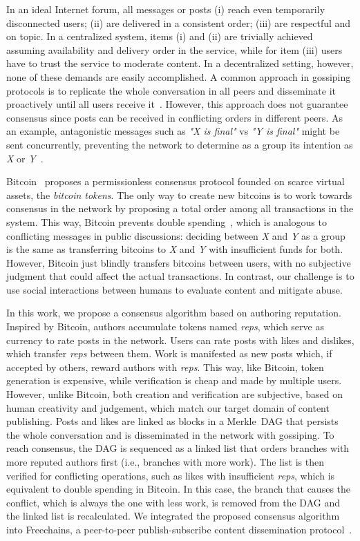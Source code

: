 \documentclass[10pt,journal,compsoc]{IEEEtran}
\newcommand{\reps}     {\emph{reps}\xspace}
\begin{document}
In an ideal Internet forum, all messages or posts
(i)   reach even temporarily disconnected users;
(ii)  are delivered in a consistent order;
(iii) are respectful and on topic.
In a centralized system, items (i) and (ii) are trivially achieved assuming
availability and delivery order in the service, while for item (iii) users have
to trust the service to moderate content.
In a decentralized setting, however, none of these demands are easily
accomplished.
A common approach in gossiping protocols is to replicate the whole conversation
in all peers and disseminate it proactively until all users receive
it~\cite{p2p.survey}.
However, this approach does not guarantee consensus since posts can be received
in conflicting orders in different peers.
As an example, antagonistic messages such as \emph{"X is final"} vs
\emph{"Y is final"} might be sent concurrently, preventing the network to
determine as a group its intention as \emph{X} or \emph{Y}~\cite{p2p.intention}.

Bitcoin~\cite{p2p.bitcoin} proposes a permissionless consensus protocol founded
on scarce virtual assets, the \emph{bitcoin tokens}.
%
The only way to create new bitcoins is to work towards consensus in the network
by proposing a total order among all transactions in the system.
%
This way, Bitcoin prevents double spending~\cite{p2p.bitcoin}, which is
analogous to conflicting messages in public discussions:
    deciding between \emph{X} and \emph{Y} as a group is the same as
    transferring bitcoins to \emph{X} and \emph{Y} with insufficient funds for
    both.
%
However, Bitcoin just blindly transfers bitcoins between users, with no
subjective judgment that could affect the actual transactions.
In contrast, our challenge is to use social interactions between humans to
evaluate content and mitigate abuse.

In this work, we propose a consensus algorithm based on authoring reputation.
Inspired by Bitcoin, authors accumulate tokens named \reps, which serve as
currency to rate posts in the network.
Users can rate posts with likes and dislikes, which transfer \reps between
them.
Work is manifested as new posts which, if accepted by others, reward authors
with \reps.
This way, like Bitcoin, token generation is expensive, while verification is
cheap and made by multiple users.
However, unlike Bitcoin, both creation and verification are subjective, based
on human creativity and judgement, which match our target domain of content
publishing.
Posts and likes are linked as blocks in a Merkle~DAG that persists the whole
conversation and is disseminated in the network with gossiping.
To reach consensus, the DAG is sequenced as a linked list that orders branches
with more reputed authors first (i.e., branches with more work).
The list is then verified for conflicting operations, such as likes with
insufficient \reps, which is equivalent to double spending in Bitcoin.
In this case, the branch that causes the conflict, which is always the one with
less work, is removed from the DAG and the linked list is recalculated.
We integrated the proposed consensus algorithm into Freechains, a peer-to-peer
publish-subscribe content dissemination protocol~\cite{fcs.sbseg20}.
\end{document}
